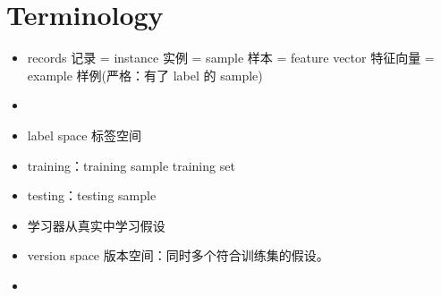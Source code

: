 \documentclass[letterpaper,10pt,english]{sphinxmanual}
\begin{document}
\section{Terminology}
\label{\detokenize{AI/main:terminology}}\begin{itemize}
\item {} 
\sphinxAtStartPar
records 记录 = instance 实例 = sample 样本 = feature vector  特征向量 = example 样例(严格：有了 label 的 sample)

\item {} \begin{description}

\end{description}

\item {} \begin{description}
\sphinxAtStartPar
label space 标签空间

\end{description}

\item {} 
\sphinxAtStartPar
training：training sample \sphinxhyphen{} training set

\item {} 
\sphinxAtStartPar
testing：testing sample

\item {} \begin{description}
\sphinxAtStartPar
学习器从真实中学习假设

\end{description}

\item {} 
\sphinxAtStartPar
version space 版本空间：同时多个符合训练集的假设。

\item {} \begin{description}
\begin{quote}

\end{quote}

\end{description}

\end{itemize}
\end{document}
